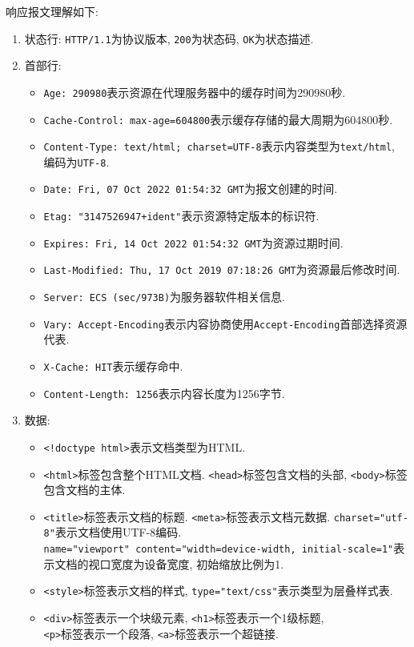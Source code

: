 \documentclass{ned-article}
\begin{document}
响应报文理解如下:
\begin{enumerate}[noitemsep]
    \item 状态行: \texttt{HTTP/1.1}为协议版本, \texttt{200}为状态码, \texttt{OK}为状态描述.
    \item 首部行:
          \begin{itemize}[noitemsep]
              \item \texttt{Age: 290980}表示资源在代理服务器中的缓存时间为290980秒.
              \item \texttt{Cache-Control: max-age=604800}表示缓存存储的最大周期为604800秒.
              \item \texttt{Content-Type: text/html; charset=UTF-8}表示内容类型为\texttt{text/html}, \\编码为\texttt{UTF-8}.
              \item \texttt{Date: Fri, 07 Oct 2022 01:54:32 GMT}为报文创建的时间.
              \item \texttt{Etag: "3147526947+ident"}表示资源特定版本的标识符.
              \item \texttt{Expires: Fri, 14 Oct 2022 01:54:32 GMT}为资源过期时间.
              \item \texttt{Last-Modified: Thu, 17 Oct 2019 07:18:26 GMT}为资源最后修改时间.
              \item \texttt{Server: ECS (sec/973B)}为服务器软件相关信息.
              \item \texttt{Vary: Accept-Encoding}表示内容协商使用\texttt{Accept-Encoding}首部选择资源代表.
              \item \texttt{X-Cache: HIT}表示缓存命中.
              \item \texttt{Content-Length: 1256}表示内容长度为1256字节.
          \end{itemize}
    \item 数据:
          \begin{itemize}
              \item \texttt{<!doctype html>}表示文档类型为HTML.
              \item \texttt{<html>}标签包含整个HTML文档. \texttt{<head>}标签包含文档的头部, \texttt{<body>}标签包含文档的主体.
              \item \texttt{<title>}标签表示文档的标题. \texttt{<meta>}标签表示文档元数据. \texttt{charset="utf-8"}表示文档使用UTF-8编码.  \\ \texttt{name="viewport" content="width=device-width, initial-scale=1"}表示文档的视口宽度为设备宽度, 初始缩放比例为1.
              \item \texttt{<style>}标签表示文档的样式, \texttt{type="text/css"}表示类型为层叠样式表.
              \item \texttt{<div>}标签表示一个块级元素, \texttt{<h1>}标签表示一个1级标题, \\ \texttt{<p>}标签表示一个段落, \texttt{<a>}标签表示一个超链接.
          \end{itemize}
\end{enumerate}
\end{document}
